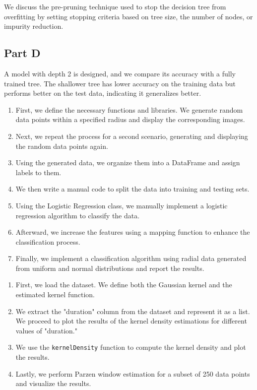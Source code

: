 \documentclass[DIV=calc, paper=a4, fontsize=11pt, twocolumn]{scrartcl}	 %
\begin{document}
    We discuss the pre-pruning technique used to stop the decision tree from overfitting by 
    setting stopping criteria based on tree size, the number of nodes, or impurity reduction.
    
  \subsection*{\small{Part D}}
    
    A model with depth 2 is designed, and we compare its accuracy with a fully trained tree. 
    The shallower tree has lower accuracy on the training data but performs better on the test 
    data, indicating it generalizes better.

\begin{enumerate}
    \item First, we define the necessary functions and libraries. We generate random data points within a specified radius and display the corresponding images.
    \item Next, we repeat the process for a second scenario, generating and displaying the random data points again.
    \item Using the generated data, we organize them into a DataFrame and assign labels to them.
    \item We then write a manual code to split the data into training and testing sets.
    \item Using the Logistic Regression class, we manually implement a logistic regression algorithm to classify the data.
    \item Afterward, we increase the features using a mapping function to enhance the classification process.
    \item Finally, we implement a classification algorithm using radial data generated from uniform and normal distributions and report the results.
\end{enumerate}


\begin{enumerate}
    \item First, we load the dataset. We define both the Gaussian kernel and the estimated kernel function.
    \item We extract the "duration" column from the dataset and represent it as a list. We proceed to plot the results of the kernel density estimations for different values of "duration."
    \item We use the \texttt{kernelDensity} function to compute the kernel density and plot the results.
    \item Lastly, we perform Parzen window estimation for a subset of 250 data points and visualize the results.
\end{enumerate}
\end{document}
